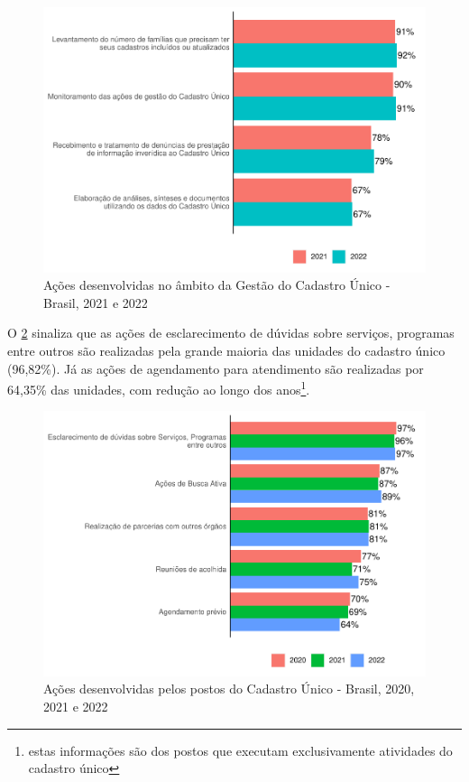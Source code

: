 \documentclass[
  brazilian]{report}
\begin{document}
\begin{figure}
\includegraphics{Censo-SUAS-2022_files/figure-latex/gestao_cad-1} \caption[Ações desenvolvidas no âmbito da Gestão do Cadastro Único - Brasil, 2021 e 2022]{Ações desenvolvidas no âmbito da Gestão do Cadastro Único - Brasil, 2021 e 2022}\label{fig:gestao_cad}
\end{figure}

O \cref{fig:acoes_cad} sinaliza que as ações de esclarecimento de
dúvidas sobre serviços, programas entre outros são realizadas pela
grande maioria das unidades do cadastro único (96,82\%). Já as ações de
agendamento para atendimento são realizadas por 64,35\% das unidades,
com redução ao longo dos
anos\footnote{estas informações são dos postos que executam exclusivamente atividades do cadastro único}.

\begin{figure}
\includegraphics{Censo-SUAS-2022_files/figure-latex/acoes_cad-1} \caption[Ações desenvolvidas pelos postos do Cadastro Único - Brasil, 2020, 2021 e 2022]{Ações desenvolvidas pelos postos do Cadastro Único - Brasil, 2020, 2021 e 2022}\label{fig:acoes_cad}
\end{figure}
\end{document}

